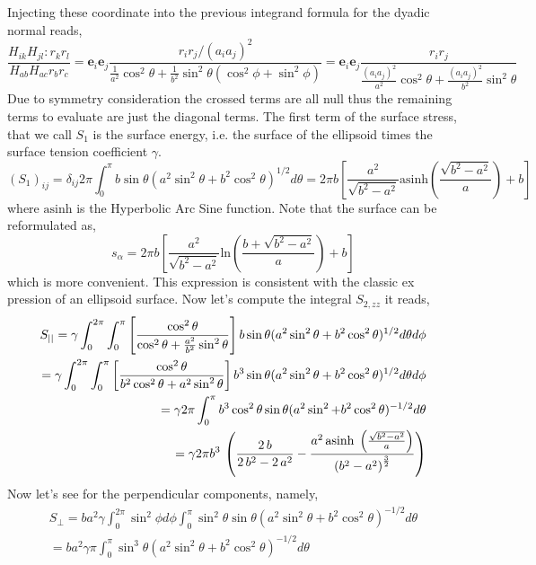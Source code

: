 Injecting these coordinate into the previous integrand formula for the dyadic normal reads, 
\begin{equation*}
    \frac{ H_{ik} H_{jl} :  r_kr_l}{  H_{ab}  H_{ac} r_br_c} 
    = \textbf{e}_i \textbf{e}_j \frac{ r_i r_j /(a_i a_j)^2 }
    {\frac{1}{a^2}\cos^2 \theta+\frac{1}{b^2}\sin^2 \theta (\cos^2 \phi+ \sin^2 \phi)}
    = \textbf{e}_i \textbf{e}_j \frac{ r_i r_j}
    {\frac{(a_i a_j)^2}{a^2}\cos^2 \theta+\frac{(a_i a_j)^2}{b^2}\sin^2 \theta }
\end{equation*}
Due to symmetry consideration the crossed terms are all null thus the remaining terms to evaluate are just the diagonal terms. 
The first term of the surface stress, that we call $S_1$ is the surface energy, i.e. the surface of the ellipsoid times the surface tension coefficient $\gamma$. 
\begin{equation*}
    (S_1)_{ij} 
    = \delta_{ij} 2\pi 
    \int_0^\pi 
    b \sin\theta (a^2\sin^2\theta+ b^2 \cos^2\theta)^{1/2} d\theta 
    = 2\pi b \left[\frac{a^2}{\sqrt{b^2-a^2}} \text{asinh}\left(\frac{\sqrt{b^2-a^2}}{a}\right)+b\right]
\end{equation*} 
where $\text{asinh}$ is the Hyperbolic Arc Sine function.
Note that the surface can be reformulated as,  
\begin{equation*}
    s_\alpha
    = 2\pi b \left[\frac{a^2}{\sqrt{b^2-a^2}} \text{ln}\left(\frac{b + \sqrt{b^2-a^2}}{a}\right)+b\right]
\end{equation*} 
which is more convenient. 
This expression is consistent with the classic ex pression of an ellipsoid surface. 
Now let's compute the integral $S_{2,zz}$ it reads, 
\begin{align*}
    S_{||}
    = 
    \gamma\int_0^{2\pi}\int_0^{\pi}\left[
        \frac{\cos^2\theta}{\cos^2 \theta+\frac{a^2}{b^2}\sin^2 \theta }
    \right]
    b \sin\theta (a^2\sin^2\theta+ b^2 \cos^2\theta)^{1/2} d\theta d\phi\\
    = 
    \gamma\int_0^{2\pi}\int_0^{\pi}\left[
        \frac{\cos^2\theta}{b^2\cos^2 \theta+a^2\sin^2 \theta }
    \right]
    b^3 \sin\theta (a^2\sin^2\theta+  b^2\cos^2\theta)^{1/2} d\theta d\phi\\
    = 
    \gamma 2\pi \int_0^{\pi}
    b^3 \cos^2\theta\sin\theta (a^2\sin^2+  b^2\cos^2\theta)^{-1/2} d\theta\\
    = \gamma 2\pi  b^3\,\left({{2\,b}\over{2\,b^2-2\,a^2}}-{{a^2\,{\rm asinh}\; \left(
    {{\sqrt{b^2-a^2}}\over{a}}\right)}\over{\left(b^2-a^2\right)^{{{3
    }\over{2}}}}}\right)
\end{align*}
Now let's see for the perpendicular components, namely, 
\begin{align*}
    S_{\bot}
    = 
    b a^2\gamma\int_0^{2\pi}\sin^2\phi d\phi 
    \int_0^{\pi}
        \sin^2\theta
    \sin\theta (a^2\sin^2\theta+ b^2 \cos^2\theta)^{-1/2} d\theta \\
    = 
    b a^2\gamma \pi
    \int_0^{\pi}
    \sin^3\theta (a^2\sin^2\theta+ b^2 \cos^2\theta)^{-1/2} d\theta \\
\end{align*}

